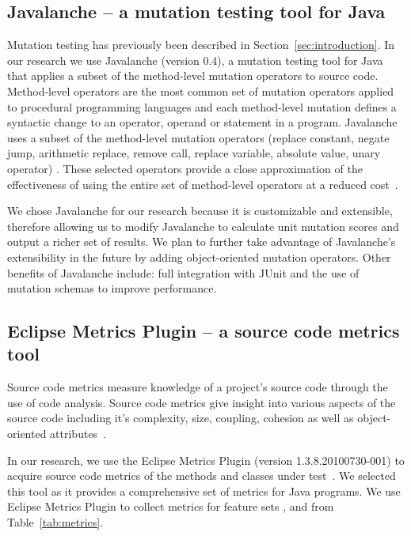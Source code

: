 \documentclass[conference]{IEEEtran}
\begin{document}
\subsection{Javalanche -- a mutation testing tool for Java}
\label{subsec:javalanche}
Mutation testing has previously been described in Section~\ref{sec:introduction}. In our research we use Javalanche (version 0.4), a mutation testing tool for Java~\cite{SZ09} that applies a subset of the method-level mutation operators to source code. Method-level operators are the most common set of mutation operators applied to procedural programming languages and each method-level mutation defines a syntactic change to an operator, operand or statement in a program. Javalanche uses a subset of the method-level mutation operators (replace constant, negate jump, arithmetic replace, remove call, replace variable, absolute value, unary operator) . These selected operators provide a close approximation of the effectiveness of using the entire set of method-level operators at a reduced cost~\cite{OLR+96}.

We chose Javalanche for our research because it is customizable and extensible, therefore allowing us to modify Javalanche to calculate unit mutation scores and output a richer set of results. We plan to further take advantage of Javalanche's extensibility in the future by adding object-oriented mutation operators. Other benefits of Javalanche include: full integration with JUnit and the use of mutation schemas to improve performance.

\subsection{Eclipse Metrics Plugin -- a source code metrics tool}
\label{subsec:Metrics}
Source code metrics measure knowledge of a project's source code through the use of code analysis. Source code metrics give insight into various aspects of the source code including it's complexity, size, coupling, cohesion as well as object-oriented attributes~\cite{SCE05,McCa76,Kan02,HWY09,Hend95,SRD12}.

In our research, we use the Eclipse Metrics Plugin (version 1.3.8.20100730-001) to acquire source code metrics of the methods and classes under test~\cite{Metrics}. We selected this tool as it provides a comprehensive set of metrics for Java programs.
We use Eclipse Metrics Plugin to collect metrics for feature sets ,  and  from Table~\ref{tab:metrics}.
\end{document}
